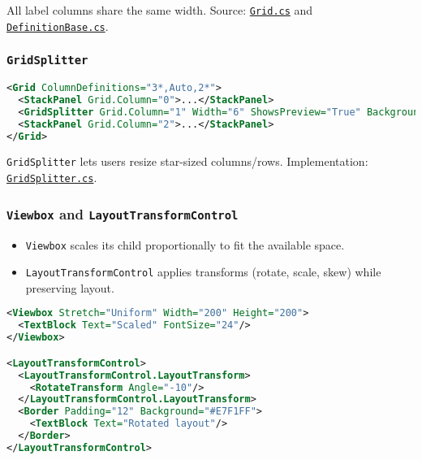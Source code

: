 All label columns share the same width. Source:
\href{https://github.com/AvaloniaUI/Avalonia/blob/master/src/Avalonia.Controls/Grid.cs}{\passthrough{\lstinline!Grid.cs!}}
and
\href{https://github.com/AvaloniaUI/Avalonia/blob/master/src/Avalonia.Controls/DefinitionBase.cs}{\passthrough{\lstinline!DefinitionBase.cs!}}.

\subsubsection{\texorpdfstring{\texttt{GridSplitter}}{GridSplitter}}\label{gridsplitter}

\begin{lstlisting}[language=XML]
<Grid ColumnDefinitions="3*,Auto,2*">
  <StackPanel Grid.Column="0">...</StackPanel>
  <GridSplitter Grid.Column="1" Width="6" ShowsPreview="True" Background="#DDD"/>
  <StackPanel Grid.Column="2">...</StackPanel>
</Grid>
\end{lstlisting}

\passthrough{\lstinline!GridSplitter!} lets users resize star-sized
columns/rows. Implementation:
\href{https://github.com/AvaloniaUI/Avalonia/blob/master/src/Avalonia.Controls/GridSplitter.cs}{\passthrough{\lstinline!GridSplitter.cs!}}.

\subsubsection{\texorpdfstring{\texttt{Viewbox} and
\texttt{LayoutTransformControl}}{Viewbox and LayoutTransformControl}}\label{viewbox-and-layouttransformcontrol}

\begin{itemize}
\tightlist
\item
  \passthrough{\lstinline!Viewbox!} scales its child proportionally to
  fit the available space.
\item
  \passthrough{\lstinline!LayoutTransformControl!} applies transforms
  (rotate, scale, skew) while preserving layout.
\end{itemize}

\begin{lstlisting}[language=XML]
<Viewbox Stretch="Uniform" Width="200" Height="200">
  <TextBlock Text="Scaled" FontSize="24"/>
</Viewbox>

<LayoutTransformControl>
  <LayoutTransformControl.LayoutTransform>
    <RotateTransform Angle="-10"/>
  </LayoutTransformControl.LayoutTransform>
  <Border Padding="12" Background="#E7F1FF">
    <TextBlock Text="Rotated layout"/>
  </Border>
</LayoutTransformControl>
\end{lstlisting}

